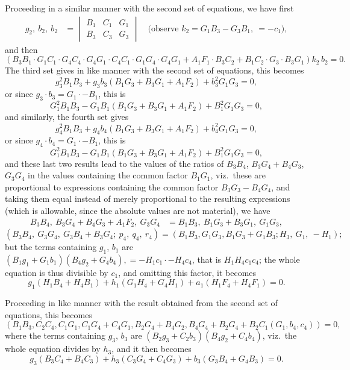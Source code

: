 \documentclass[11pt,a4paper]{article}
\begin{document}
Proceeding in a similar manner with the second set of equations, we have
first
\[
\begin{aligned}
g_2,\ b_2,\ b_2 &= \begin{vmatrix} B_1 & C_1 & G_1 \\ B_3 & C_3 & G_3 \end{vmatrix}\quad
\text{(observe } k_2 = G_1 B_3 - G_3 B_1, \ = -c_1\text{)},
\end{aligned}
\]
and then
\[
(B_3 B_1 \cdot G_1 C_1 \cdot G_4 C_4 \cdot G_4 G_1 \cdot C_4 C_1 \cdot G_1 G_4 \cdot G_4 G_1
+ A_1 F_1 \cdot B_3 C_2 + B_1 C_2 \cdot G_3 \cdot B_3 G_1) k_2\, b_2 = 0.
\]
The third set gives in like manner with the second set of equations, this
becomes
\[
g_3^{2} B_1 B_3 + g_3 b_3 (B_1 G_3 + B_3 G_1 + A_1 F_2) + b_3^{2} G_1 G_3 = 0,
\]
or since $g_3 \cdot b_3 = G_1 \cdot - B_1$, this is
\[
G_1^{2} B_1 B_3 - G_1 B_1 (B_1 G_3 + B_3 G_1 + A_1 F_2) + B_1^{2} G_1 G_3 = 0,
\]
and similarly, the fourth set gives
\[
g_4^{2} B_1 B_3 + g_4 b_4 (B_1 G_3 + B_3 G_1 + A_1 F_2) + b_4^{2} G_1 G_3 = 0,
\]
or since $g_4 \cdot b_4 = G_1 \cdot - B_1$, this is
\[
G_1^{2} B_1 B_3 - G_1 B_1 (B_1 G_3 + B_3 G_1 + A_1 F_2) + B_1^{2} G_1 G_3 = 0,
\]
and these last two results lead to the values of the ratios of
$B_3 B_4$, $B_3 G_4 + B_4 G_3$, $G_3 G_4$ in the values containing the
common factor $B_1 G_1$, viz.\ these are proportional to expressions
containing the common factor $B_3 G_3 - B_4 G_4$, and taking them equal
instead of merely proportional to the resulting expressions (which is
allowable, since the absolute values are not material), we have
\[
\begin{aligned}
B_3 B_4 ,\ B_3 G_4 + B_4 G_3 + A_1 F_2,\ G_3 G_4 &= B_1 B_3,\ B_1 G_3 + B_3 G_1,\ G_1 G_3,
\end{aligned}
\]
\[
(B_3 B_4,\ G_3 G_4,\ G_3 B_4 + B_3 G_4 ;\ p_4,\ q_4,\ r_4)
= (B_1 B_3, G_1 G_3, B_1 G_3 + G_1 B_3 ; H_3,\ G_1 ,\ -H_1) ;
\]
but the terms containing $g_1$, $b_1$ are $(B_1 g_1 + G_1 b_1)(B_4 g_2 + G_4 b_4),
= -H_1 c_1 \cdot - H_4 c_4$, that is $H_1 H_4 c_1 c_4$; the whole equation is
thus divisible by $c_1$, and omitting this factor, it becomes
\[
g_1 (H_1 B_4 + H_4 B_1) + h_1 (G_1 H_4 + G_4 H_1) + a_1 (H_1 F_4 + H_4 F_1) = 0.
\]

Proceeding in like manner with the result obtained from the second set of
equations, this becomes
\[
(B_1 B_3, C_2 C_4, C_1 G_1, C_1 G_4 + C_4 G_1, B_2 G_4 + B_4 G_2, B_4 G_4 + B_2 G_4
+ B_2 C_1 (G_1, b_4, c_4)) = 0,
\]
where the terms containing $g_3$, $b_3$ are $(B_2 g_3 + C_2 b_3)(B_4 g_2 + C_4 b_4)$,
viz.\ the whole equation divides by $h_3$, and it then becomes
\[
g_3 (B_3 C_4 + B_4 C_3) + h_3 (C_3 G_4 + C_4 G_3) + b_3 (G_3 B_4 + G_4 B_3) = 0.
\]
\end{document}
